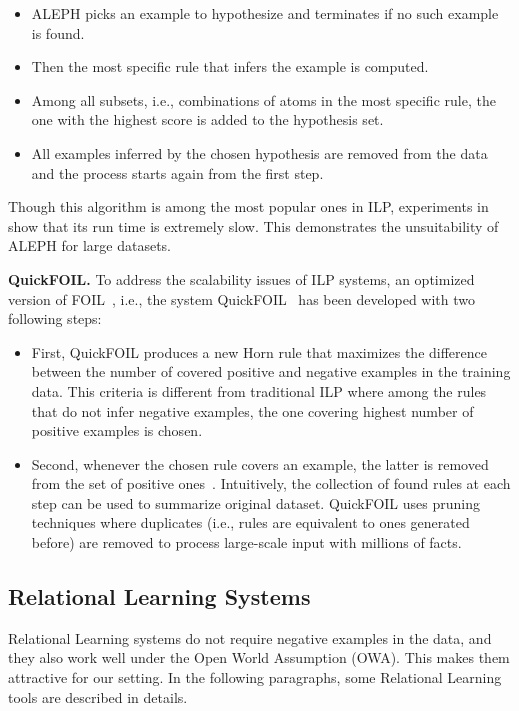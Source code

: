 \begin{itemize}
\item ALEPH picks an example to hypothesize and terminates if no such example is found.
\item Then the most specific rule that infers the example is computed.
\item Among all subsets, i.e., combinations of atoms in the most specific rule, the one with the highest score is added to the hypothesis set.
\item All examples inferred by the chosen hypothesis are removed from the data and the process starts again from the first step.
\end{itemize}

Though this algorithm is among the most popular ones in ILP, experiments in~\cite{ref10} show that its run time is extremely slow. This demonstrates the unsuitability of ALEPH for large datasets.

\textbf{QuickFOIL.} To address the scalability issues of ILP systems, an optimized version of FOIL~\cite{ref36}, i.e., the system QuickFOIL~\cite{ref45} has been developed with two following steps:

\begin{itemize}
\item First, QuickFOIL produces a new Horn rule that maximizes the difference between the number of covered positive and negative examples in the training data. This criteria is different from traditional ILP where among the rules that do not infer negative examples, the one covering highest number of positive examples is chosen.
\item Second, whenever the chosen rule covers an example, the latter is removed from the set of positive ones~\cite{ref10}. Intuitively, the collection of found rules at each step can be used to summarize original dataset. QuickFOIL uses pruning techniques where duplicates (i.e., rules are equivalent to ones generated before) are removed to process large-scale input with millions of facts.

\end{itemize}

\subsection{Relational Learning Systems}

Relational Learning systems do not require negative examples in the data, and they also work well under the Open World Assumption (OWA). This makes them attractive for our setting. In the following paragraphs, some Relational Learning tools are described in details.

